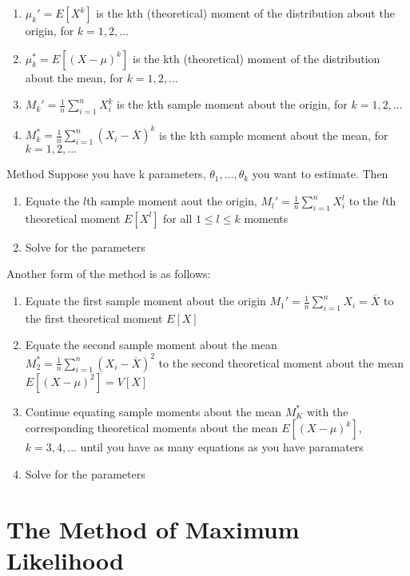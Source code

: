 \documentclass[12pt, a4paper, twoside, openright, titlepage]{book}
\begin{document}
\begin{defn}{}{}
    \leavevmode
    \begin{enumerate}
        \item $\mu_k' = E[X^k]$ is the kth (theoretical) moment of the distribution about the origin, for $k = 1,2,...$
        \item $\mu_k^* = E[(X-\mu)^k]$ is the kth (theoretical) moment of the distribution about the mean, for $k = 1,2,...$
        \item $M_k' = \frac{1}{n}\sum_{i=1}^nX_i^k$ is the kth sample moment about the origin, for $k = 1,2,...$
        \item $M_k^* = \frac{1}{n}\sum_{i=1}^n(X_i-\overline{X})^k$ is the kth sample moment about the mean, for $k = 1,2,...$
    \end{enumerate}
\end{defn}

\begin{proc}{Method}{}
    Suppose you have k parameters, $\theta_1,...,\theta_k$ you want to estimate. Then \begin{enumerate}
        \item Equate the $l$th sample moment aout the origin, $M_l' = \frac{1}{n}\sum_{i=1}^nX_i^l$ to the $l$th theoretical moment $E[X^l]$ for all $1 \leq l \leq k$ moments
        \item Solve for the parameters
    \end{enumerate}
    Another form of the method is as follows: \begin{enumerate}
        \item Equate the first sample moment about the origin $M_1' = \frac{1}{n}\sum_{i=1}^nX_i = \overline{X}$ to the first theoretical moment $E[X]$ 
        \item Equate the second sample moment about the mean $M_2^* = \frac{1}{n}\sum_{i=1}^n(X_i - \overline{X})^2$ to the second theoretical moment about the mean $E[(X-\mu)^2] = V[X]$
        \item Continue equating sample moments about the mean $M_K^*$ with the corresponding theoretical moments about the mean $E[(X-\mu)^k]$, $k =3,4,...$ until you have as many equations as you have paramaters
        \item Solve for the parameters
    \end{enumerate}
\end{proc}

\section{The Method of Maximum Likelihood}
\end{document}
